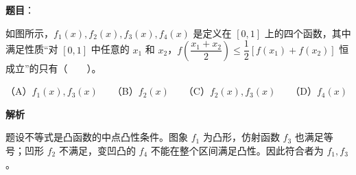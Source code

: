 \begin{answer}

\textbf{题目}：

如图所示，\(f_1(x),f_2(x),f_3(x),f_4(x)\) 是定义在 \([0,1]\) 上的四个函数，其中满足性质“对 \([0,1]\) 中任意的 \(x_1\) 和 \(x_2\)，\(f\left(\dfrac{x_1+x_2}{2}\right)\leqslant\dfrac12[f(x_1)+f(x_2)]\) 恒成立”的只有\mbox{（　　）}。
\nopagebreak[4]
\begin{center}\end{center}
\nopagebreak[4]
（A）\(f_1(x),f_3(x)\)　　（B）\(f_2(x)\)　　（C）\(f_2(x),f_3(x)\)　　（D）\(f_4(x)\)

\textbf{解析}

题设不等式是凸函数的中点凸性条件。图象 $f_1$ 为凸形，仿射函数 $f_3$ 也满足等号；凹形 $f_2$ 不满足，变凹凸的 $f_4$ 不能在整个区间满足凸性。因此符合者为 $f_1,f_3$。


\end{answer}

